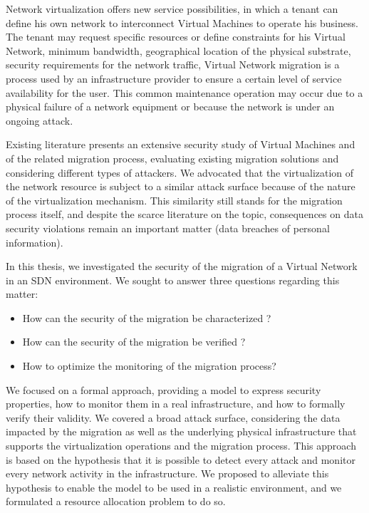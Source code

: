 
\label{sec:thesis_conclusion}
Network virtualization offers new service possibilities, in which a tenant can define his own network to interconnect Virtual Machines to operate his business. The tenant may request specific resources or define constraints for his Virtual Network, \eg minimum bandwidth, geographical location of the physical substrate, security requirements for the network traffic, \etc
Virtual Network migration is a process used by an infrastructure provider to ensure a certain level of service availability for the user.
This common maintenance operation may occur due to a physical failure of a network equipment or because the network is under an ongoing attack.

Existing literature presents an extensive security study of Virtual Machines and of the related migration process, evaluating existing migration solutions and considering different types of attackers. We advocated that the virtualization of the network resource is subject to a similar attack surface because of the nature of the virtualization mechanism. This similarity still stands for the migration process itself, and despite the scarce literature on the topic, consequences on data security violations remain an important matter (\eg data breaches of personal information).

In this thesis, we investigated the security of the migration of a Virtual Network in an SDN environment. 
We sought to answer three questions regarding this matter:

\begin{itemize}
    \item How can the security of the migration be characterized ?
    \item How can the security of the migration be verified ?
    \item How to optimize the monitoring of the migration process? 
\end{itemize}

We focused on a formal approach, providing a model to express security properties, how to monitor them in a real infrastructure, and how to formally verify their validity. 
We covered a broad attack surface, considering the data impacted by the migration as well as the underlying physical infrastructure that supports the virtualization operations and the migration process. 
This approach is based on the hypothesis that it is possible to detect every attack and monitor every network activity in the infrastructure. 
We proposed to alleviate this hypothesis to enable the model to be used in a realistic environment, and we formulated a resource allocation problem to do so.

